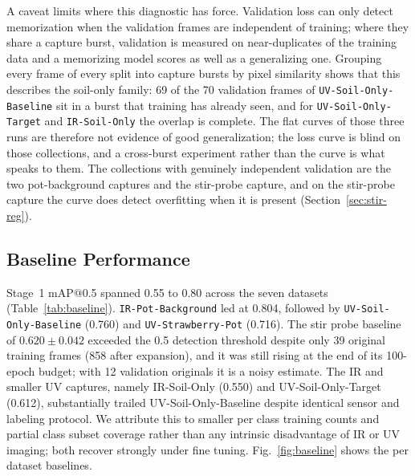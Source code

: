 ﻿\documentclass[journal]{IEEEtran}
\begin{document}
A caveat limits where this diagnostic has force. Validation loss can only detect memorization when the validation frames are independent of training; where they share a capture burst, validation is measured on near-duplicates of the training data and a memorizing model scores as well as a generalizing one. Grouping every frame of every split into capture bursts by pixel similarity shows that this describes the soil-only family: 69 of the 70 validation frames of \texttt{UV-Soil-Only-Baseline} sit in a burst that training has already seen, and for \texttt{UV-Soil-Only-Target} and \texttt{IR-Soil-Only} the overlap is complete. The flat curves of those three runs are therefore not evidence of good generalization; the loss curve is blind on those collections, and a cross-burst experiment rather than the curve is what speaks to them. The collections with genuinely independent validation are the two pot-background captures and the stir-probe capture, and on the stir-probe capture the curve does detect overfitting when it is present (Section~\ref{sec:stir-reg}).

\subsection{Baseline Performance}
Stage~1 mAP@0.5 spanned 0.55 to 0.80 across the seven datasets (Table~\ref{tab:baseline}). \texttt{IR-Pot-Background} led at 0.804, followed by \texttt{UV-Soil-Only-Baseline} (0.760) and \texttt{UV-Strawberry-Pot} (0.716). The stir probe baseline of $0.620 \pm 0.042$ exceeded the 0.5 detection threshold despite only 39 original training frames (858 after expansion), and it was still rising at the end of its 100-epoch budget; with 12 validation originals it is a noisy estimate. The IR and smaller UV captures, namely IR-Soil-Only (0.550) and UV-Soil-Only-Target (0.612), substantially trailed UV-Soil-Only-Baseline despite identical sensor and labeling protocol. We attribute this to smaller per class training counts and partial class subset coverage rather than any intrinsic disadvantage of IR or UV imaging; both recover strongly under fine tuning. Fig.~\ref{fig:baseline} shows the per dataset baselines.
\end{document}
